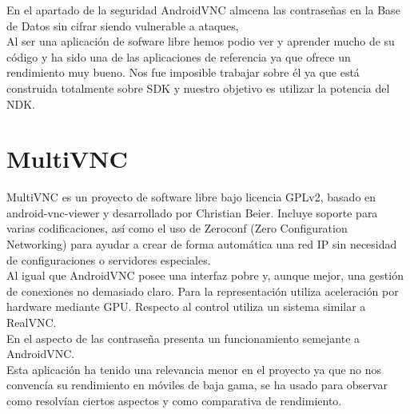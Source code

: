 En el apartado de la seguridad AndroidVNC almcena las contraseñas en la Base de Datos sin cifrar siendo vulnerable a ataques,\\

Al ser una aplicación de sofware libre hemos podio ver y aprender mucho de su código y ha sido una de las aplicaciones de referencia ya que ofrece un rendimiento muy bueno. Nos fue imposible trabajar sobre él ya que está construida totalmente sobre SDK y nuestro objetivo es utilizar la potencia del NDK.

\section{MultiVNC}
MultiVNC\cite{multivnc:multivnc} es un proyecto de software libre bajo licencia GPLv2,  basado en android-vnc-viewer y desarrollado por Christian Beier. Incluye soporte para varias codificaciones, así como el uso de Zeroconf (Zero Configuration Networking) para ayudar a crear de forma automática una red IP sin necesidad de configuraciones o servidores especiales.\\

Al igual que AndroidVNC posee una interfaz pobre y, aunque mejor, una gestión de conexiones no demasiado claro. Para la representación utiliza aceleración por hardware mediante GPU. Respecto al control utiliza un sistema similar a RealVNC.\\

En el aspecto de las contraseña presenta un funcionamiento semejante a AndroidVNC.\\

Esta aplicación ha tenido una relevancia menor en el proyecto ya que no nos convencía su rendimiento en móviles de baja gama, se ha usado para observar como resolvían ciertos aspectos y como comparativa de rendimiento.
